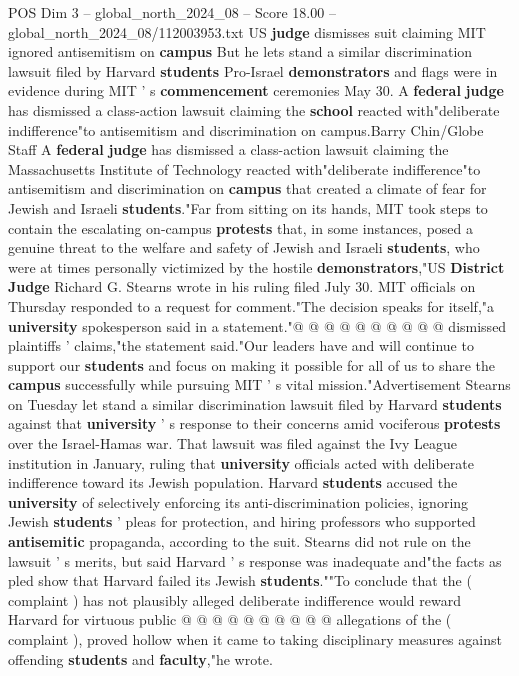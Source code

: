 \begin{textsample}{POS Dim 3 – global\_north\_2024\_08 – Score 18.00 – global\_north\_2024\_08/112003953.txt}  \label{ex:f3_pos_147}
US \textbf{judge} dismisses suit claiming MIT ignored antisemitism on \textbf{campus} But he lets stand a similar discrimination lawsuit filed by Harvard \textbf{students} Pro-Israel \textbf{demonstrators} and flags were in evidence during MIT ' s \textbf{commencement} ceremonies May 30.
A \textbf{federal} \textbf{judge} has dismissed a class-action lawsuit claiming the \textbf{school} reacted with"deliberate indifference"to antisemitism and discrimination on campus.Barry Chin/Globe Staff A \textbf{federal} \textbf{judge} has dismissed a class-action lawsuit claiming the Massachusetts Institute of Technology reacted with"deliberate indifference"to antisemitism and discrimination on \textbf{campus} that created a climate of fear for Jewish and Israeli \textbf{students}."Far from sitting on its hands, MIT took steps to contain the escalating on-campus \textbf{protests} that, in some instances, posed a genuine threat to the welfare and safety of Jewish and Israeli \textbf{students}, who were at times personally victimized by the hostile \textbf{demonstrators},"US \textbf{District} \textbf{Judge} Richard G.
Stearns wrote in his ruling filed July 30.
MIT officials on Thursday responded to a request for comment."The decision speaks for itself,"a \textbf{university} spokesperson said in a statement."@ @ @ @ @ @ @ @ @ @ dismissed plaintiffs ' claims,"the statement said."Our leaders have and will continue to support our \textbf{students} and focus on making it possible for all of us to share the \textbf{campus} successfully while pursuing MIT ' s vital mission."Advertisement Stearns on Tuesday let stand a similar discrimination lawsuit filed by Harvard \textbf{students} against that \textbf{university} ' s response to their concerns amid vociferous \textbf{protests} over the Israel-Hamas war.
That lawsuit was filed against the Ivy League institution in January, ruling that \textbf{university} officials acted with deliberate indifference toward its Jewish population.
Harvard \textbf{students} accused the \textbf{university} of selectively enforcing its anti-discrimination policies, ignoring Jewish \textbf{students} ' pleas for protection, and hiring professors who supported \textbf{antisemitic} propaganda, according to the suit.
Stearns did not rule on the lawsuit ' s merits, but said Harvard ' s response was inadequate and"the facts as pled show that Harvard failed its Jewish \textbf{students}.""To conclude that the ( complaint ) has not plausibly alleged deliberate indifference would reward Harvard for virtuous public @ @ @ @ @ @ @ @ @ @ allegations of the ( complaint ), proved hollow when it came to taking disciplinary measures against offending \textbf{students} and \textbf{faculty},"he wrote.

\end{textsample}
